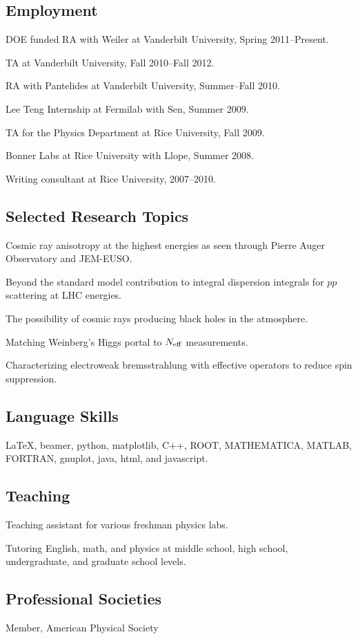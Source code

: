 \documentclass[letterpaper]{article}
\renewenvironment{itemize}{
\begin{list}{}{
\setlength{\leftmargin}{1.5em}
}
}{
\end{list}
}
\begin{document}
\subsection*{Employment}
\begin{itemize}
\item DOE funded RA with Weiler at Vanderbilt University, Spring 2011--Present.
\item TA at Vanderbilt University, Fall 2010--Fall 2012.
\item RA with Pantelides at Vanderbilt University, Summer--Fall 2010.
\item Lee Teng Internship at Fermilab with Sen, Summer 2009.
\item TA for the Physics Department at Rice University, Fall 2009.
\item Bonner Labs at Rice University with Llope, Summer 2008.
\item Writing consultant at Rice University, 2007--2010.
\end{itemize}
\subsection*{Selected Research Topics}
\begin{itemize}
\item Cosmic ray anisotropy at the highest energies as seen through Pierre Auger Observatory and JEM-EUSO.
\item Beyond the standard model contribution to integral dispersion integrals for $pp$ scattering at LHC energies.
\item The possibility of cosmic rays producing black holes in the atmosphere.
\item Matching Weinberg's Higgs portal to $N_{\rm{eff}}$ measurements.
\item Characterizing electroweak bremsstrahlung with effective operators to reduce spin suppression.
\end{itemize}
\subsection*{Language Skills}
\begin{itemize}
\item 
\LaTeX, beamer, python, matplotlib, C++, ROOT, MATHEMATICA, MATLAB, FORTRAN, gnuplot, java, html, and javascript.
\end{itemize}
\subsection*{Teaching}
\begin{itemize}
\item Teaching assistant for various freshman physics labs.
\item Tutoring English, math, and physics at middle school, high school, undergraduate, and graduate school levels.
\end{itemize}
\subsection*{Professional Societies}
\begin{itemize}
\item Member, American Physical Society
\end{itemize}
\end{document}

